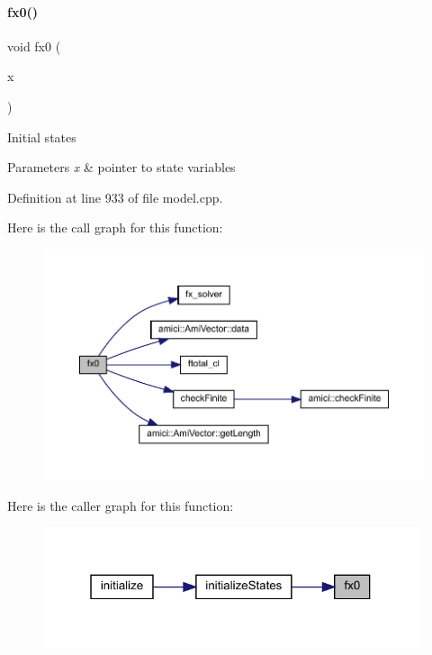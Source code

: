 \paragraph{\texorpdfstring{fx0()}{fx0()}\hspace{0.1cm}{\footnotesize\ttfamily [1/2]}}
{\footnotesize\ttfamily void fx0 (\begin{DoxyParamCaption}\item[{\mbox{\hyperlink{classamici_1_1_ami_vector}{Ami\+Vector}} $\ast$}]{x }\end{DoxyParamCaption})}

Initial states 
\begin{DoxyParams}{Parameters}
{\em x} & pointer to state variables \\
\hline
\end{DoxyParams}


Definition at line 933 of file model.\+cpp.

Here is the call graph for this function\+:
\nopagebreak
\begin{figure}[H]
\begin{center}
\leavevmode
\includegraphics[width=350pt]{classamici_1_1_model_aa9a9e12a414d9ac91249b63d01ab7bca_cgraph}
\end{center}
\end{figure}
Here is the caller graph for this function\+:
\nopagebreak
\begin{figure}[H]
\begin{center}
\leavevmode
\includegraphics[width=313pt]{classamici_1_1_model_aa9a9e12a414d9ac91249b63d01ab7bca_icgraph}
\end{center}
\end{figure}
\mbox{\label{classamici_1_1_model_ae517574d2a7c504c388438a08a1aed38}} 
